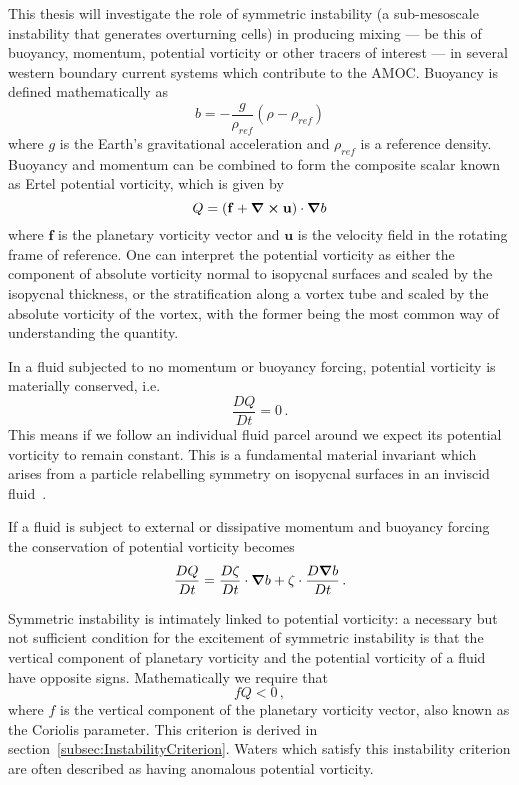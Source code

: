 This thesis will investigate the role of symmetric instability (a sub-mesoscale instability that generates overturning cells) in producing mixing --- be this of buoyancy, momentum, potential vorticity or other tracers of interest --- in several western boundary current systems which contribute to the AMOC. Buoyancy is defined mathematically as
\begin{equation}
    b = -\frac{g}{\rho_{ref}}(\rho - \rho_{ref})
\end{equation}
where $g$ is the Earth's gravitational acceleration and $\rho_{ref}$ is a reference density. Buoyancy and momentum can be combined to form the composite scalar known as Ertel potential vorticity, which is given by
\begin{equation}
    \label{eq:EPV}
    Q = (\mathbf{f} + \curl{\mathbf{u}}) \cdot \grad{b}
\end{equation}
where $\mathbf{f}$ is the planetary vorticity vector and $\mathbf{u}$ is the velocity field in the rotating frame of reference. One can interpret the potential vorticity as either the component of absolute vorticity normal to isopycnal surfaces and scaled by the isopycnal thickness, or the stratification along a vortex tube and scaled by the absolute vorticity of the vortex, with the former being the most common way of understanding the quantity.

In a fluid subjected to no momentum or buoyancy forcing, potential vorticity is materially conserved, i.e.
\begin{equation}
    \label{eq:PVConservation}
    \frac{DQ}{Dt} = 0 \, .
\end{equation}
This means if we follow an individual fluid parcel around we expect its potential vorticity to remain constant. This is a fundamental material invariant which arises from a particle relabelling symmetry on isopycnal surfaces in an inviscid fluid~\citep{Salmon1998}.

If a fluid is subject to external or dissipative momentum and buoyancy forcing the conservation of potential vorticity  becomes
\begin{equation}
    \frac{DQ}{Dt} = \frac{D\mathbf{\zeta}}{Dt} \cdot  \grad{b} + \mathbf{\zeta} \cdot \frac{D\grad{b}}{Dt} \, .
\end{equation}

Symmetric instability is intimately linked to potential vorticity: a necessary but not sufficient condition for the excitement of symmetric instability is that the vertical component of planetary vorticity and the potential vorticity of a fluid have opposite signs. Mathematically we require that
\begin{equation}
    \label{eq:PVSI1}
    f Q < 0 \, ,
\end{equation}
where $f$ is the vertical component of the planetary vorticity vector, also known as the Coriolis parameter. This criterion is derived in section~\ref{subsec:InstabilityCriterion}. Waters which satisfy this instability criterion are often described as having anomalous potential vorticity.

